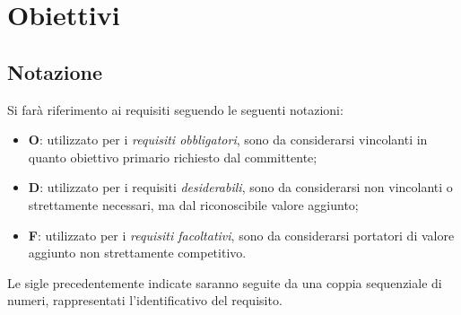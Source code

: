 \section{Obiettivi}
\subsection{Notazione}
Si farà riferimento ai requisiti seguendo le seguenti notazioni:
\begin{itemize}
\item \textbf{O}: utilizzato per i \textit{requisiti obbligatori}, sono da considerarsi vincolanti in quanto obiettivo primario richiesto dal committente;
\item \textbf{D}: utilizzato per i requisiti \textit{desiderabili}, sono da considerarsi non vincolanti o strettamente necessari, ma dal riconoscibile valore
aggiunto;
\item \textbf{F}: utilizzato per i \textit{requisiti facoltativi}, sono da considerarsi portatori di valore aggiunto non strettamente competitivo.
\end{itemize}
Le sigle precedentemente indicate saranno seguite da una coppia sequenziale di numeri, rappresentati l'identificativo del requisito.

